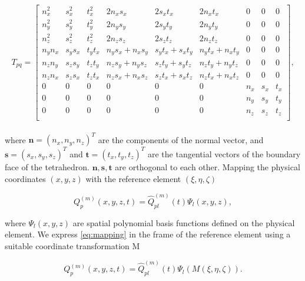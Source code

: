 \begin{align}
    \begin{split}
    T_{pq} = 
        \begin{bmatrix}
        n_x^2 & s_x^2 & t_x^2 & 2n_x s_x & 2s_x t_x & 2n_x t_x & 0 & 0 & 0 \\
        n_y^2 & s_y^2 & t_y^2 & 2n_y s_y & 2s_y t_y & 2n_y t_y & 0 & 0 & 0 \\
        n_z^2 & s_z^2 & t_z^2 & 2n_z s_z & 2s_z t_z & 2n_z t_z & 0 & 0 & 0 \\
        n_y n_x & s_y s_x & t_y t_x & n_y s_x + n_x s_y & s_y t_x + s_x t_y & n_y t_x + n_x t_y & 0 & 0 & 0 \\
        n_z n_y & s_z s_y & t_z t_y & n_z s_y + n_y s_z & s_z t_y + s_y t_z & n_z t_y + n_y t_z & 0 & 0 & 0 \\
        n_z n_x & s_z s_x & t_z t_x & n_z s_x + n_x s_z & s_z t_x + s_x t_z & n_z t_x + n_x t_z & 0 & 0 & 0 \\
        0 & 0 & 0 & 0 & 0 & 0 & n_x & s_x & t_x \\
        0 & 0 & 0 & 0 & 0 & 0 & n_y & s_y & t_y \\
        0 & 0 & 0 & 0 & 0 & 0 & n_z & s_z & t_z \\
    \end{bmatrix},
    \end{split}
\end{align}

where $\mathbf{n} = \left(n_x, n_y, n_z\right)^T$ are the components of the normal vector, and $\mathbf{s} = \left(s_x, s_y, s_z\right)^T$ and
$\mathbf{t} = \left(t_x, t_y, t_z\right)^T$ are the tangential vectors of the boundary face of the tetrahedron. $\mathbf{n}, \mathbf{s}, \mathbf{t}$
are orthogonal to each other. Mapping the physical coordinates $\left(x, y, z\right)$ with the reference element $\left(\xi, \eta, \zeta\right)$

\begin{equation}
    Q_p^{\left(m\right)} \left(x,y,z,t\right) = \hat{Q}_{pl}^{\left(m\right)} \left(t\right) \Psi_l \left(x, y, z\right),
    \label{eq:mapping}
\end{equation}

where $\Psi_l\left(x,y,z\right)$ are spatial polynomial basis functions defined on the physical element. We express \ref{eq:mapping} in 
the frame of the reference element using a suitable coordinate transformation M

\begin{equation}
     Q_p^{\left(m\right)}\left(x,y,z,t\right) = \hat{Q}_{pl}^{\left(m\right)}\left(t\right) \Psi_l\left(M\left(\xi, \eta, \zeta\right)\right).
\end{equation}


